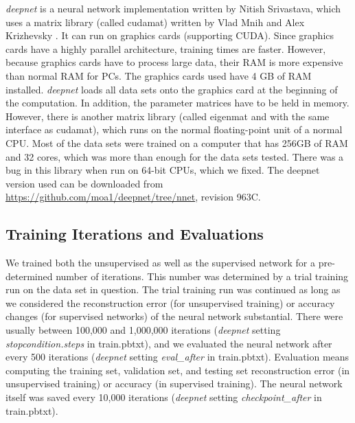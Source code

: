 \emph{deepnet} is a neural network implementation written by Nitish
Srivastava, which uses a matrix library (called cudamat) written by
Vlad Mnih and Alex Krizhevsky \cite{Deepnet2014}. It can run on graphics
cards (supporting CUDA). Since graphics cards have a highly parallel
architecture, training times are faster. However, because graphics
cards have to process large data, their RAM is more expensive than
normal RAM for PCs. The graphics cards used have 4 GB of RAM installed.
\emph{deepnet} loads all data sets onto the graphics card at the beginning
of the computation. In addition, the parameter matrices have to be
held in memory. However, there is another matrix library (called
eigenmat and with the same interface as cudamat), which runs on the
normal floating-point unit of a normal CPU. Most of the data sets
were trained on a computer that has 256GB of RAM and 32 cores, which
was more than enough for the data sets tested. There was a bug in
this library when run on 64-bit CPUs, which we fixed. The deepnet
version used can be downloaded from \href{https://github.com/moa1/deepnet/tree/nnet}{https://github.com/moa1/deepnet/tree/nnet},
revision 963C.

\subsection{Training Iterations and Evaluations}

We trained both the unsupervised as well as the supervised network
for a pre-determined number of iterations. This number was determined
by a trial training run on the data set in question. The trial training
run was continued as long as we considered the reconstruction error
(for unsupervised training) or accuracy changes (for supervised networks)
of the neural network substantial. There were usually between 100,000
and 1,000,000 iterations (\emph{deepnet} setting \emph{stopcondition.steps}
in train.pbtxt), and we evaluated the neural network after every 500
iterations (\emph{deepnet} setting \emph{eval\_after} in train.pbtxt).
Evaluation means computing the training set, validation set, and testing
set reconstruction error (in unsupervised training) or accuracy (in
supervised training). The neural network itself was saved every 10,000
iterations (\emph{deepnet} setting \emph{checkpoint\_after} in train.pbtxt).

